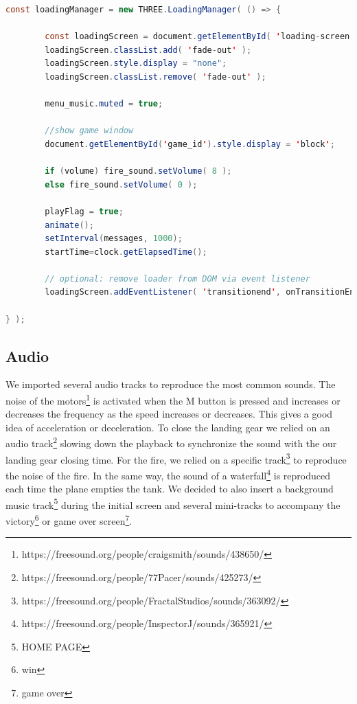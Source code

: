 \documentclass{article}
\begin{document}
\begin{lstlisting}[language=Java, caption=Loading manager]
const loadingManager = new THREE.LoadingManager( () => {
    
        const loadingScreen = document.getElementById( 'loading-screen' );
        loadingScreen.classList.add( 'fade-out' );
        loadingScreen.style.display = "none";
        loadingScreen.classList.remove( 'fade-out' );

        menu_music.muted = true;
        
        //show game window
        document.getElementById('game_id').style.display = 'block';

        if (volume) fire_sound.setVolume( 8 );
        else fire_sound.setVolume( 0 );

        playFlag = true;
        animate();
        setInterval(messages, 1000);
        startTime=clock.getElapsedTime();
        
        // optional: remove loader from DOM via event listener
        loadingScreen.addEventListener( 'transitionend', onTransitionEnd );
        
} );
\end{lstlisting}

\subsection*{Audio}
We imported several audio tracks to reproduce the most common sounds. The noise of the motors\footnote{https://freesound.org/people/craigsmith/sounds/438650/} is activated when the M button is pressed and increases or decreases the frequency as the speed increases or decreases. This gives a good idea of acceleration or deceleration. To close the landing gear we relied on an audio track\footnote{https://freesound.org/people/77Pacer/sounds/425273/} slowing down the playback to synchronize the sound with the our  landing gear closing time. For the fire, we relied on a specific track\footnote{https://freesound.org/people/FractalStudios/sounds/363092/} to reproduce the noise of the fire. In the same way, the sound of a waterfall\footnote{https://freesound.org/people/InspectorJ/sounds/365921/} is reproduced each time the plane empties the tank. We decided to also insert a background music track\footnote{HOME PAGE} during the initial screen and several mini-tracks to accompany the victory\footnote{win} or game over screen\footnote{game over}. 
\end{document}
